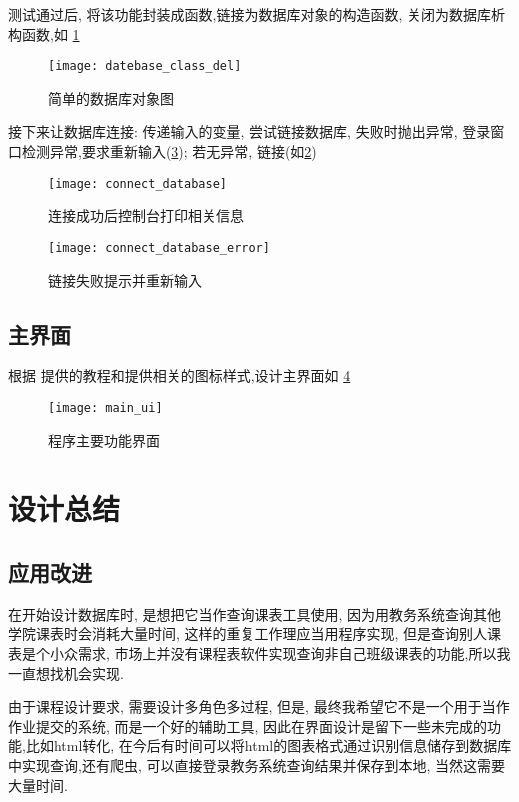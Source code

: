 \documentclass{myreport}
\begin{document}
    测试通过后, 将该功能封装成函数,链接为数据库对象的构造函数,
    关闭为数据库析构函数,如
    \cref{fig:datebase_class_del}
    \begin{figure}[H]
      \centering
      \texttt{[image: datebase\_class\_del]}
      \caption{简单的数据库对象图}
      \label{fig:datebase_class_del}
    \end{figure}

    接下来让数据库连接:
    传递输入的变量, 尝试链接数据库,
    失败时抛出异常, 登录窗口检测异常,要求重新输入(\cref{fig:connect_database_error}); 若无异常, 链接(如\cref{fig:connect_database})

    \begin{figure}[H]
      \centering
      \texttt{[image: connect\_database]}
      \caption{连接成功后控制台打印相关信息}
      \label{fig:connect_database}
    \end{figure}

    \begin{figure}[H]
      \centering
      \texttt{[image: connect\_database\_error]}
      \caption{链接失败提示并重新输入}
      \label{fig:connect_database_error}
    \end{figure}

  \subsection{主界面}
    根据 \cite{pyqt5_beautify} 提供的教程和\cite{icon}提供相关的图标样式,设计主界面如
    \cref{fig:main_ui}
    \begin{figure}[H]
      \centering
      \texttt{[image: main\_ui]}
      \caption{程序主要功能界面}
      \label{fig:main_ui}
    \end{figure}

\section{设计总结}
  \subsection{应用改进}
    在开始设计数据库时, 是想把它当作查询课表工具使用,
    因为用教务系统查询其他学院课表时会消耗大量时间,
    这样的重复工作理应当用程序实现,
    但是查询别人课表是个小众需求, 市场上并没有课程表软件实现查询非自己班级课表的功能,所以我一直想找机会实现.

    由于课程设计要求, 需要设计多角色多过程,
    但是, 最终我希望它不是一个用于当作作业提交的系统,
    而是一个好的辅助工具, 因此在界面设计是留下一些未完成的功能,比如html转化, 在今后有时间可以将html的图表格式通过识别信息储存到数据库中实现查询,还有爬虫, 可以直接登录教务系统查询结果并保存到本地, 当然这需要大量时间.
\end{document}

